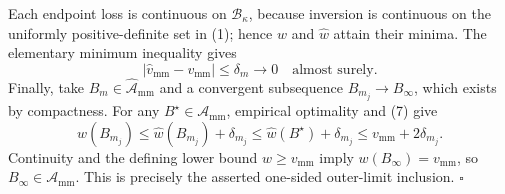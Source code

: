 Each endpoint loss is continuous on \(\mathcal B_\kappa\), because inversion is continuous on the uniformly positive-definite set in (1); hence \(w\) and \(\widehat w\) attain their minima.  The elementary minimum inequality gives
\[
|\widehat v_{\mathrm{mm}}-v_{\mathrm{mm}}|
\le\delta_m\longrightarrow0
\quad\text{almost surely}.
\tag{8}
\]
Finally, take \(B_m\in\widehat{\mathcal A}_{\mathrm{mm}}\) and a convergent subsequence \(B_{m_j}\to B_\infty\), which exists by compactness.  For any \(B^\star\in\mathcal A_{\mathrm{mm}}\), empirical optimality and (7) give
\[
w(B_{m_j})
\le\widehat w(B_{m_j})+\delta_{m_j}
\le\widehat w(B^\star)+\delta_{m_j}
\le v_{\mathrm{mm}}+2\delta_{m_j}.
\]
Continuity and the defining lower bound \(w\ge v_{\mathrm{mm}}\) imply \(w(B_\infty)=v_{\mathrm{mm}}\), so \(B_\infty\in\mathcal A_{\mathrm{mm}}\).  This is precisely the asserted one-sided outer-limit inclusion. \(\square\)